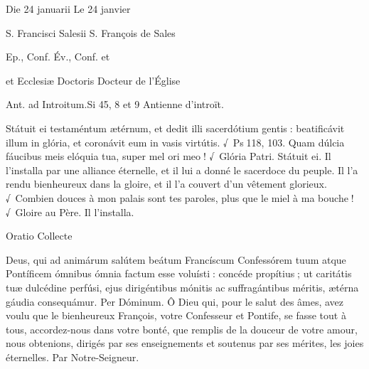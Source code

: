 \begin{paracol}{2}
\switchcolumn
{}
\switchcolumn*

\vspace{.3cm}
\switchcolumn
\vspace{.3cm}
\switchcolumn*


Die 24 januarii
\switchcolumn
Le 24 janvier
\switchcolumn*

S. Francisci Salesii
\switchcolumn
S. François de Sales
\switchcolumn*

Ep., Conf.
\switchcolumn
Év., Conf. et
\switchcolumn*

et Ecclesiæ Doctoris
\switchcolumn
Docteur de l’Église
\switchcolumn*

Ant. ad Introitum.\hfill Si 45, 8 et 9
\switchcolumn
Antienne d’introït.
\switchcolumn*

Státuit ei testaméntum ætérnum, et dedit illi sacerdótium gentis : beatificávit illum in glória, et coronávit eum in vasis virtútis. √~Ps 118, 103. Quam dúlcia fáucibus meis elóquia tua, super mel ori meo ! √~Glória Patri. Státuit ei.
\switchcolumn
Il l’installa par une alliance éternelle, et il  lui a donné le sacerdoce du peuple. Il l’a rendu bienheureux dans la gloire, et il l’a couvert d’un vêtement glorieux. √~Combien douces à mon palais sont tes paroles, plus que le miel à ma bouche ! √~Gloire au Père. Il l’installa.
\switchcolumn*

Oratio
\switchcolumn
Collecte
\switchcolumn*

Deus, qui ad animárum salútem  beátum Francíscum Confessórem tuum atque Pontíficem ómnibus ómnia factum esse voluísti : concéde propítius ; ut caritátis tuæ dulcédine perfúsi, ejus dirigéntibus mónitis ac suffragántibus méritis, ætérna gáudia consequámur. Per Dóminum.
\switchcolumn
Ô Dieu qui, pour le salut des âmes, avez  voulu que le bienheureux François, votre Confesseur et Pontife, se fasse tout à tous, accordez-nous dans votre bonté, que remplis de la douceur de votre amour, nous obtenions, dirigés par ses enseignements et soutenus par ses mérites, les joies éternelles. Par Notre-Seigneur.
\switchcolumn*


\end{paracol}
